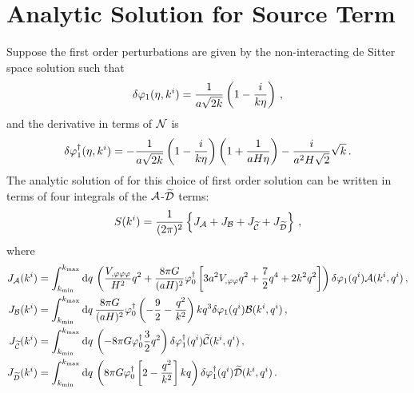 % 


\section{Analytic Solution for Source Term}
\label{sec:analyticsrc-apx}
Suppose the first order perturbations are given by the non-interacting de Sitter space solution
such that
% 
 \begin{equation}
 \delta\varphi_{1}(\eta, k^i) = \frac{1}{a\sqrt{2 k}} \left( 1 - \frac{i}{k \eta}\right) \,,
\end{equation}
% 
and the derivative in terms of $\mathcal{N}$ is 
% 
\begin{equation}
 \delta\varphi_{1}^{\dagger}(\eta, k^i) = -  \frac{1}{a\sqrt{2 k}} \left( 1 -
                        \frac{i}{k \eta}\right) \left(1 + \frac{1}{aH\eta}\right)
                         - \frac{i}{a^2 H \sqrt{2}}\sqrt{k}\,.
\end{equation}
% 
The analytic solution of  for this choice of first order
solution can be written in terms of four integrals of the $\mathcal{A}$-$\widetilde{\mathcal{D}}$ terms:
% 
\begin{equation}
\label{eq:KG2-source-jterms}
S(k^i) = \frac{1}{(2\pi)^2} \left\{J_{\mathcal{A}} + J_{\mathcal{B}} + J_{\widetilde{\mathcal{C}}} + J_{\widetilde{\mathcal{D}}} \right\}\,,
\end{equation}
% 
where
\begin{align}
 J_\A(\kvi) &= \int_{\kmin}^{\kmax} \d q\, \left( 
                \frac{\Uppp}{H^2} q^2 + \frac{8\pi G}{(aH)^2}\dN{\vp_{0}}\left[ 
 3a^2\Upp q^2  + \frac{7}{2}q^4 + 2k^2q^2 \right] \right) \dvp1(\qvi) \A(\kvi, \qvi) \,, \\
% 
 J_\B(\kvi) &= \int_{\kmin}^{\kmax} \d q\, \frac{8\pi G}{(aH)^2}\dN{\vp_{0}}\left(-\frac{9}{2} -
\frac{q^2}{k^2}\right)kq^3 \dvp1(\qvi) \B(\kvi, \qvi) \,, \\
%  
J_{\wt{\C}}(\kvi) &= \int_{\kmin}^{\kmax} \d q\, \left(
                        -8\pi G \dN{\vp_{0}} \frac{3}{2}q^2 \right) \dN{\dvp1}(\qvi)
\wt{\C}(\kvi, \qvi) \,, \\
%  
J_{\wt{\D}}(\kvi) &= \int_{\kmin}^{\kmax} \d q\, \left(
                       8\pi G \dN{\vp_{0}} \left[2-\frac{q^2}{k^2}\right] kq \right)
\dN{\dvp1}(\qvi) \wt{\D}(\kvi, \qvi) \,. \\
\end{align}
% 

